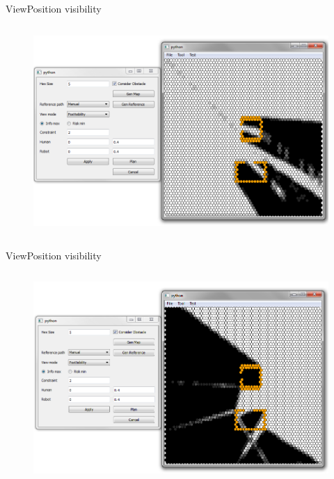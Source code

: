 \begin{frame}{View}{Position visibility}

\begin{columns}
\begin{figure}
\centering
\includegraphics[width = \textwidth]{./screenshot/position_visibility_view1.png}
\end{figure}

\begin{minipage}{\textwidth}
\end{minipage}
\end{columns}

\end{frame}

\begin{frame}{View}{Position visibility}

\begin{columns}
\begin{figure}
\centering
\includegraphics[width = \textwidth]{./screenshot/position_visibility_view2.png}
\end{figure}

\begin{minipage}{\textwidth}
\end{minipage}
\end{columns}

\end{frame}

